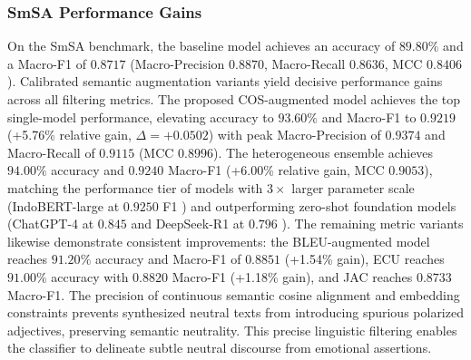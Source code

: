 \documentclass{ieeeaccess}
\begin{document}
\subsubsection{SmSA Performance Gains}
On the SmSA benchmark, the baseline model achieves an accuracy of $89.80\%$ and a Macro-F1 of $0.8717$ (Macro-Precision $0.8870$, Macro-Recall $0.8636$, MCC $0.8406$). Calibrated semantic augmentation variants yield decisive performance gains across all filtering metrics. The proposed COS-augmented model achieves the top single-model performance, elevating accuracy to \textbf{$93.60\%$} and Macro-F1 to \textbf{$0.9219$} (+5.76\% relative gain, $\Delta = +0.0502$) with peak Macro-Precision of \textbf{$0.9374$} and Macro-Recall of \textbf{$0.9115$} (MCC \textbf{$0.8996$}). The heterogeneous ensemble achieves \textbf{$94.00\%$} accuracy and \textbf{$0.9240$} Macro-F1 (+6.00\% relative gain, MCC \textbf{$0.9053$}), matching the performance tier of models with $3\times$ larger parameter scale (IndoBERT-large at $0.9250$ F1 \cite{wilie2020indonlu}) and outperforming zero-shot foundation models (ChatGPT-4 at $0.845$ and DeepSeek-R1 at $0.796$ \cite{nasution2025benchmarking}). The remaining metric variants likewise demonstrate consistent improvements: the BLEU-augmented model reaches \textbf{$91.20\%$} accuracy and Macro-F1 of \textbf{$0.8851$} (+1.54\% gain), ECU reaches \textbf{$91.00\%$} accuracy with $0.8820$ Macro-F1 (+1.18\% gain), and JAC reaches $0.8733$ Macro-F1. The precision of continuous semantic cosine alignment and embedding constraints prevents synthesized neutral texts from introducing spurious polarized adjectives, preserving semantic neutrality. This precise linguistic filtering enables the classifier to delineate subtle neutral discourse from emotional assertions.

\begin{table}[!t]
\caption{Per-Class F1-Score Breakdown on SmSA and HoASA}
\label{tab:per_class_f1}
\centering
\footnotesize
\setlength{\tabcolsep}{3.5pt}

\end{table}
\end{document}
